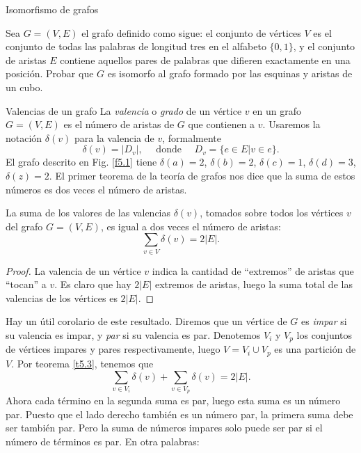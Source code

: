 \begin{section}{Isomorfismo de grafos}
\begin{enumex}
\item Sea $G=(V,E)$ el grafo definido como sigue: el conjunto de vértices $V$ es el conjunto de todas las palabras de longitud tres en el alfabeto $\{0,1\}$, y el conjunto de aristas $E$ contiene aquellos pares de palabras que difieren exactamente en una posición. Probar que $G$ es isomorfo al grafo formado por las esquinas y aristas de un cubo.
\end{enumex}

\end{section}


\begin{section}{Valencias de un grafo}\label{seccion-valencias-de-un-grafo}
La \textit{{valencia}} o \textit{grado} de un vértice $v$ en un grafo $G=(V,E)$ es el  número de aristas de $G$ que contienen a $v$. Usaremos la notación $\delta(v)$ para la valencia de $v$, formalmente
$$
\delta(v)=|D_v|, \quad \text{ donde } \quad D_v=\{e \in E| v\in
e\}.
$$
El grafo descrito en Fig. \ref{f5.1} tiene $\delta(a)=2$, $\delta(b)=2$, $\delta(c)=1$, $\delta(d)=3$, $\delta(z)=2$. El primer teorema de la teoría de grafos nos dice que la suma de estos números es dos veces el número de aristas.

\begin{teorema}\label{t5.3} La suma de los valores de las valencias $\delta(v)$, tomados sobre todos los vértices $v$ del grafo $G=(V,E)$, es igual a dos veces el número de aristas:
$$
\sum_{v \in V} \delta(v) = 2|E|.
$$
\end{teorema}
\begin{proof} La valencia de un vértice $v$ indica la cantidad de ``extremos'' de aristas que ``tocan'' a $v$. Es claro que hay $2|E|$ extremos de aristas, luego la suma total de las valencias de los vértices es $2|E|$.
\end{proof}

Hay un útil corolario de este resultado. Diremos que un vértice de $G$ es \textit{impar} si su     valencia es impar, y \textit{par} si su valencia es par. Denotemos $V_i$ y $V_p$ los conjuntos de vértices impares y pares respectivamente, luego $V=V_i \cup V_p$ es una partición de $V$. Por teorema \ref{t5.3}, tenemos que
$$
\sum_{v \in V_i} \delta(v) + \sum_{v \in V_p} \delta(v)= 2|E|.
$$
Ahora cada término en la segunda suma es par, luego esta suma es un número par. Puesto que el lado derecho también es un número par, la primera suma debe ser también par. Pero la suma de números impares solo puede ser par si el número de términos es par. En otra palabras:


\end{section}
